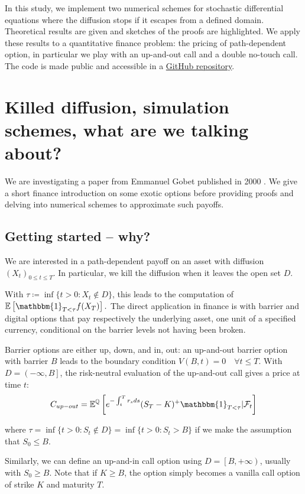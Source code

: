 In this study, we implement two numerical schemes for stochastic differential equations where the diffusion stops if it escapes from a defined domain. Theoretical results are given and sketches of the proofs are highlighted. We apply these results to a quantitative finance problem: the pricing of path-dependent option, in particular we play with an up-and-out call and a double no-touch call. The code is made public and accessible in a \href{https://github.com/vtisserand/killed_diffusion}{GitHub repository}.

\section{Killed diffusion, simulation schemes, what are we talking about?}

We are investigating a paper from Emmanuel Gobet published in 2000 \cite{gobet2000weak}. We give a short finance introduction on some exotic options before providing proofs and delving into numerical schemes to approximate such payoffs.

\subsection{Getting started -- why?}

We are interested in a path-dependent payoff on an asset with diffusion $(X_t)_{0\leq t \leq T}$.
In particular, we kill the diffusion when it leaves the open set $D$.\newline

With $\tau \coloneqq \inf\{t > 0 : X_t \notin D\}$, this leads to the computation of $\mathbb{E}\left[\mathbbm{1}_{T < \tau} f(X_T)\right].$ The direct application in finance is with barrier and digital options that pay respectively the underlying asset, one unit of a specified currency, conditional on the barrier levels not having been broken.


Barrier options are either up, down, and in, out: an up-and-out barrier option with barrier $B$ leads to the boundary condition $V(B, t) = 0 \quad \forall t \leq T.$ With $D = \left(-\infty, B\right]$,
the risk-neutral evaluation of the up-and-out call gives a price at time $t$: \[C_{up-out } = \mathbb{E}^{\mathbb{Q}}\left[e^{-\int_t^T r_s ds} (S_T-K)^{+} \mathbbm{1}_{T < \tau} \vert \mathcal{F}_t\right]\]

where $\tau = \inf\{t > 0 : S_t \notin D\} = \inf\{t > 0 : S_t > B\}$ if we make the assumption that $S_0 \leq B$.

Similarly, we can define an up-and-in call option using $D = \left[B, +\infty\right)$, usually with $S_0 \geq B$. Note that if $K \geq B$, the option simply becomes a vanilla call option of strike $K$ and maturity $T$.

